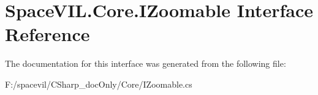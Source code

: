 \hypertarget{interface_space_v_i_l_1_1_core_1_1_i_zoomable}{}\section{Space\+V\+I\+L.\+Core.\+I\+Zoomable Interface Reference}
\label{interface_space_v_i_l_1_1_core_1_1_i_zoomable}


The documentation for this interface was generated from the following file\+:\begin{DoxyCompactItemize}
\item 
F\+:/spacevil/\+C\+Sharp\+\_\+doc\+Only/\+Core/I\+Zoomable.\+cs\end{DoxyCompactItemize}
